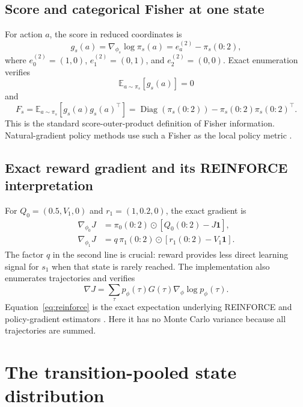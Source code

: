 \documentclass[10pt,a4paper]{article}
\newcommand{\E}{\mathbb{E}}
\begin{document}
\subsection{Score and categorical Fisher at one state}

For action $a$, the score in reduced coordinates is
\begin{equation}
g_s(a)=\nabla_{\phi_s}\log\pi_s(a)
=e_a^{(2)}-\pi_s(0{:}2),
\label{eq:score}
\end{equation}
where $e_0^{(2)}=(1,0)$, $e_1^{(2)}=(0,1)$, and
$e_2^{(2)}=(0,0)$.  Exact enumeration verifies
\begin{equation}
\E_{a\sim\pi_s}[g_s(a)]=0
\end{equation}
and
\begin{equation}
F_s
=\E_{a\sim\pi_s}[g_s(a)g_s(a)^\top]
=\operatorname{Diag}(\pi_s(0{:}2))
-\pi_s(0{:}2)\pi_s(0{:}2)^\top.
\label{eq:state-fisher}
\end{equation}
This is the standard score-outer-product definition of Fisher information.
Natural-gradient policy methods use such a Fisher as the local policy metric
\cite{Kakade2001}.

\subsection{Exact reward gradient and its REINFORCE interpretation}

For $Q_0=(0.5,V_1,0)$ and $r_1=(1,0.2,0)$, the exact gradient is
\begin{align}
\nabla_{\phi_0}J
&=\pi_0(0{:}2)\odot[Q_0(0{:}2)-J\mathbf 1],\\
\nabla_{\phi_1}J
&=q\,\pi_1(0{:}2)\odot[r_1(0{:}2)-V_1\mathbf 1].
\label{eq:reward-gradient}
\end{align}
The factor $q$ in the second line is crucial: reward provides less direct
learning signal for $s_1$ when that state is rarely reached.  The implementation
also enumerates trajectories and verifies
\begin{equation}
\nabla J
=\sum_\tau p_\phi(\tau)G(\tau)\nabla_\phi\log p_\phi(\tau).
\label{eq:reinforce}
\end{equation}
Equation~\eqref{eq:reinforce} is the exact expectation underlying REINFORCE
\cite{Williams1992} and policy-gradient estimators
\cite{SuttonMcAllester2000}.  Here it has no Monte Carlo variance because all
trajectories are summed.

\section{The transition-pooled state distribution}
\end{document}

